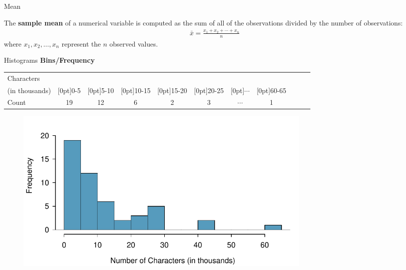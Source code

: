 \documentclass[12pt,a4paper]{beamer}
\begin{document}
\begin{frame}{Mean}
\begin{framed}
	The \textbf{sample mean} of a numerical variable is computed as the sum of all of the observations divided by the number of observations:
	\begin{eqnarray*}
	\bar{x} = \frac{x_1+x_2+\cdots+x_n}{n}
	\end{eqnarray*}
	where $x_1, x_2, \dots, x_n$ represent the $n$ observed values.
\end{framed}
\end{frame}
\begin{frame}{Histograms}
\textbf{Bins/Frequency}
	
\vspace{1cm}	
\small\begin{tabular}{l ccc ccc ccc c}
		  \hline
		Characters & \\
		(in thousands) & \raisebox{1.5ex}[0pt]{0-5} & \raisebox{1.5ex}[0pt]{5-10} & \raisebox{1.5ex}[0pt]{10-15} & \raisebox{1.5ex}[0pt]{15-20} & \raisebox{1.5ex}[0pt]{20-25} &  \raisebox{1.5ex}[0pt]{$\cdots$} & \raisebox{1.5ex}[0pt]{60-65} \\
		  \hline
		Count & 19 & 12 & 6 & 2 & 3 & $\cdots$ & 1 \\
		  \hline
\end{tabular}
\begin{figure}[bth]
   \centering
   \includegraphics[width=0.72\textwidth]{figures/email50NumCharHist/email50NumCharHist}
\end{figure}
	
		
\end{frame}
\end{document}
